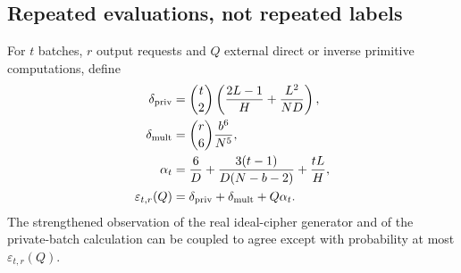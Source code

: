\documentclass[journal=tosc,preprint,floatrow,nohyperxmp]{iacrtrans}
\numberwithin{lemma}{section}
\numberwithin{proposition}{section}
\numberwithin{equation}{section}
\theoremstyle{definition}
\numberwithin{definition}{section}
\theoremstyle{plain}
\begin{document}
\subsection{Repeated evaluations, not repeated labels}
\begin{lemma}\label{lem:coupling}
For $t$ batches, $r$ output requests and $Q$ external direct or inverse primitive computations, define
\begin{align}
 \delta_{\rm priv}&=\binom t2\left(\frac{2L-1}{H}+\frac{L^2}{ND}\right),\label{eq:priv}\\
 \delta_{\rm mult}&=\binom r6\frac{b^6}{N^5},\label{eq:mult}\\
 \alpha_t&=\frac6D+\frac{3(t-1)}{D(N-b-2)}+\frac{tL}{H},\label{eq:alpha}\\
 \varepsilon_{t,r}(Q)&=\delta_{\rm priv}+\delta_{\rm mult}+Q\alpha_t.\label{eq:epsilon}
\end{align}
The strengthened observation of the real ideal-cipher generator and of the private-batch calculation can be coupled to agree except with probability at most $\varepsilon_{t,r}(Q)$.
\end{lemma}
\end{document}
